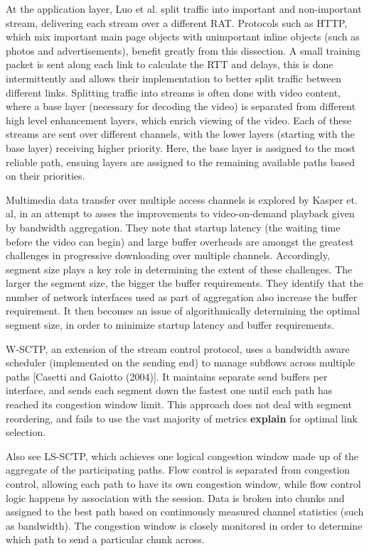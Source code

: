 \documentclass[12pt]{article}
\newcommand{\comment}[1]
{{\bfseries \color{blue} #1}}
\begin{document}
	At the application layer, Luo et al. \cite{1204756} split traffic into important and non-important stream, delivering each stream over a different RAT. Protocols such as HTTP, which mix important main page objects with unimportant inline objects (such as photos and advertisements), benefit greatly from this dissection. A small training packet is sent along each link to calculate the RTT and delays, this is done intermittently and allows their implementation to better split traffic between different links. Splitting traffic into streams is often done with video content, where a base layer (necessary for decoding the video) is separated from different high level enhancement layers, which enrich viewing of the video. Each of these streams are sent over different channels, with the lower layers (starting with the base layer) receiving higher priority. Here, the base layer is assigned to the most reliable path, ensuing layers are assigned to the remaining available paths based on their priorities\cite{1363842}.

	Multimedia data transfer over multiple access channels is explored by Kasper et. al, in an attempt to asses the improvements to video-on-demand playback given by bandwidth aggregation. They note that startup latency (the waiting time before the video can begin) and large buffer overheads are amongst the greatest challenges in progressive downloading over multiple channels. Accordingly, segment size plays a key role in determining the extent of these challenges. The larger the segment size, the bigger the buffer requirements. They identify that the number of network interfaces used as part of aggregation also increase the buffer requirement. It then becomes an issue of algorithmically determining the optimal segment size, in order to minimize startup latency and buffer requirements\cite{5421846}.

	W-SCTP, an extension of the stream control protocol, uses a bandwidth aware scheduler (implemented on the sending end) to manage subflows across multiple paths [Casetti and Gaiotto (2004)]. It maintains separate send buffers per interface, and sends each segment down the fastest one until each path has reached its congestion window limit. This approach does not deal with segment reordering, and fails to use the vast majority of metrics\comment{explain} for optimal link selection. 

	Also see LS-SCTP, which achieves one logical congestion window made up of the aggregate of the participating paths. Flow control is separated from congestion control, allowing each path to have its own congestion window, while flow control logic happens by association with the session. Data is broken into chunks and assigned to the best path based on continuously measured channel statistics (such as bandwidth). The congestion window is closely monitored in order to determine which path to send a particular chunk across\cite{AbdElAl20041012}.
\end{document}
